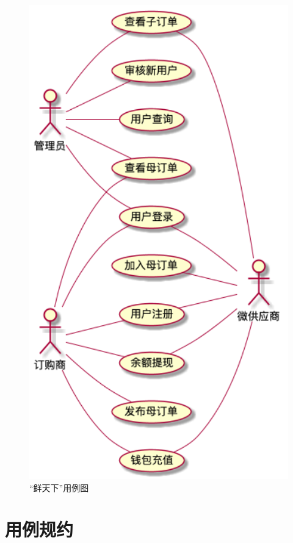 \begin{figure}[htp]
    \centering
    \includegraphics[width=12cm]{figure/usecase/uc_main_ver3.png}
    \caption{“鲜天下”用例图}
    \label{fig:usecase-main}
\end{figure}


\section{用例规约}

